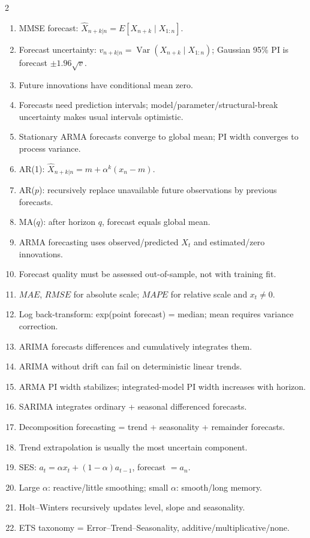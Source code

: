 \documentclass[9pt,a4paper]{extarticle}
\begin{document}
\begin{multicols}{2}
\begin{enumerate}
\item MMSE forecast: \(\widehat X_{n+k|n}=E[X_{n+k}\mid X_{1:n}]\).
\item Forecast uncertainty: \(v_{n+k|n}=\operatorname{Var}(X_{n+k}\mid X_{1:n})\); Gaussian 95\% PI is forecast \(\pm1.96\sqrt v\).
\item Future innovations have conditional mean zero.
\item Forecasts need prediction intervals; model/parameter/structural-break uncertainty makes usual intervals optimistic.
\item Stationary ARMA forecasts converge to global mean; PI width converges to process variance.
\item AR(1): \(\widehat X_{n+k|n}=m+\alpha^k(x_n-m)\).
\item AR($p$): recursively replace unavailable future observations by previous forecasts.
\item MA($q$): after horizon \(q\), forecast equals global mean.
\item ARMA forecasting uses observed/predicted \(X_t\) and estimated/zero innovations.
\item Forecast quality must be assessed out-of-sample, not with training fit.
\item \(MAE\), \(RMSE\) for absolute scale; \(MAPE\) for relative scale and \(x_t\neq0\).
\item Log back-transform: exp(point forecast) = median; mean requires variance correction.
\item ARIMA forecasts differences and cumulatively integrates them.
\item ARIMA without drift can fail on deterministic linear trends.
\item ARMA PI width stabilizes; integrated-model PI width increases with horizon.
\item SARIMA integrates ordinary + seasonal differenced forecasts.
\item Decomposition forecasting = trend + seasonality + remainder forecasts.
\item Trend extrapolation is usually the most uncertain component.
\item SES: \(a_t=\alpha x_t+(1-\alpha)a_{t-1}\), forecast \(=a_n\).
\item Large \(\alpha\): reactive/little smoothing; small \(\alpha\): smooth/long memory.
\item Holt--Winters recursively updates level, slope and seasonality.
\item ETS taxonomy = Error--Trend--Seasonality, additive/multiplicative/none.

\end{enumerate}
\end{multicols}
\end{document}
